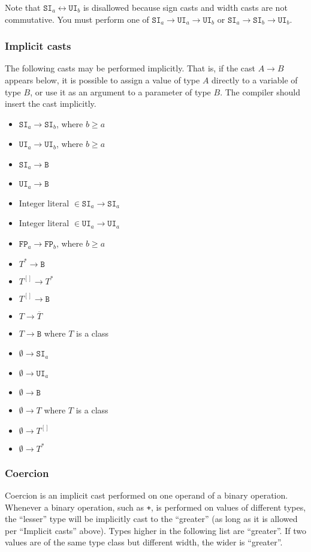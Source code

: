 \documentclass{article}
\newcommand{\R}[1]{\mathtt{#1}}
\newcommand{\both}{\leftrightarrow}
\begin{document}
Note that $\R{SI}_a \both \R{UI}_b$ is disallowed because sign casts and width
casts are not commutative. You must perform one of
$\R{SI}_a \to \R{UI}_a \to \R{UI}_b$ or $\R{SI}_a \to \R{SI}_b \to \R{UI}_b$.

\subsubsection{Implicit casts}
\label{ssb:types:casting:implicit}
The following casts may be performed implicitly. That is, if the cast
$A \to B$ appears below, it is possible to assign a value of type $A$ directly
to a variable of type $B$, or use it as an argument to a parameter of type
$B$. The compiler should insert the cast implicitly.

\begin{itemize}
\item{$\R{SI}_a \to \R{SI}_b$, where $b \geq a$}
\item{$\R{UI}_a \to \R{UI}_b$, where $b \geq a$}
\item{$\R{SI}_a \to \R{B}$}
\item{$\R{UI}_a \to \R{B}$}
\item{Integer literal $\in \R{SI}_a \to \R{SI}_a$}
\item{Integer literal $\in \R{UI}_a \to \R{UI}_a$}
\item{$\R{FP}_a \to \R{FP}_b$, where $b \geq a$}
\item{$T^* \to \R{B}$}
\item{$T^{[]} \to T^*$}
\item{$T^{[]} \to \R{B}$}
\item{$T \to \overline{T}$}
\item{$T \to \R{B}$ where $T$ is a class}
\item{$\emptyset \to \R{SI}_a$}
\item{$\emptyset \to \R{UI}_a$}
\item{$\emptyset \to \R{B}$}
\item{$\emptyset \to T$ where $T$ is a class}
\item{$\emptyset \to T^{[]}$}
\item{$\emptyset \to T^*$}
\end{itemize}

\subsubsection{Coercion}
\label{ssb:types:casting:coercion}
Coercion is an implicit cast performed on one operand of a binary operation.
Whenever a binary operation, such as \texttt{+}, is performed on values of
different types, the ``lesser'' type will be implicitly cast to the
``greater'' (as long as it is allowed per ``Implicit casts'' above).
Types higher in the following list are ``greater''. If two values are of the
same type class but different width, the wider is ``greater''.
\end{document}
